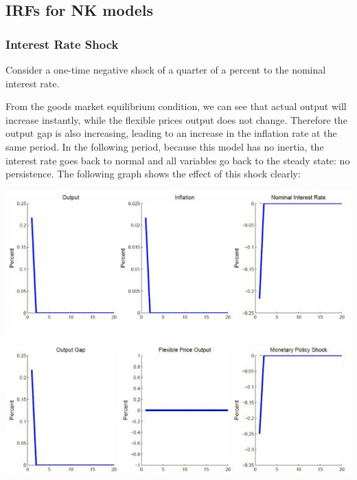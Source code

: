 \documentclass[12pt]{report}
\begin{document}
\subsection{IRFs for NK models}

\subsubsection{Interest Rate Shock}

Consider a one-time negative shock of a quarter of a percent to the nominal interest rate.

From the goods market equilibrium condition, we can see that actual output will increase instantly, while the flexible prices output does not change. Therefore the output gap is also increasing, leading to an increase in the inflation rate at the same period. In the following period, because this model has no inertia, the interest rate goes back to normal and all variables go back to the steady state: no persistence. The following graph shows the effect of this shock clearly: \begin{center}
\includegraphics[scale=0.5]{images/moneyshock3DNK}
\end{center}
\end{document}
